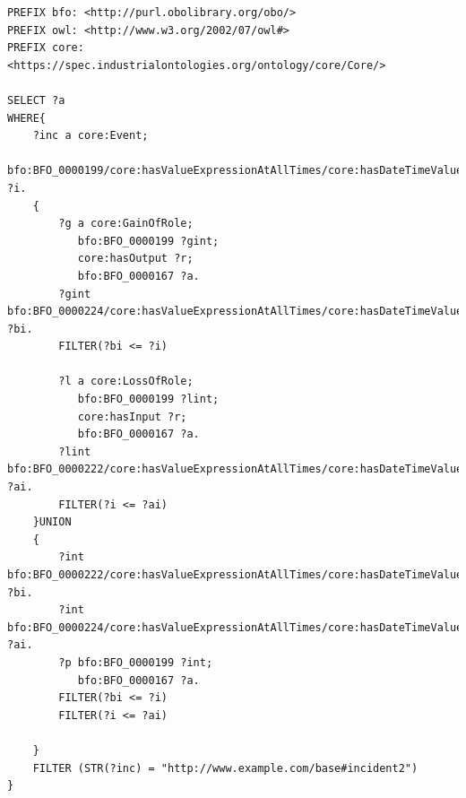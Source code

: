 \begin{verbatim}
PREFIX bfo: <http://purl.obolibrary.org/obo/>
PREFIX owl: <http://www.w3.org/2002/07/owl#>
PREFIX core: <https://spec.industrialontologies.org/ontology/core/Core/>

SELECT ?a
WHERE{
    ?inc a core:Event;
         bfo:BFO_0000199/core:hasValueExpressionAtAllTimes/core:hasDateTimeValue ?i.      
    {    
    	?g a core:GainOfRole;
           bfo:BFO_0000199 ?gint;
           core:hasOutput ?r;
           bfo:BFO_0000167 ?a.
        ?gint bfo:BFO_0000224/core:hasValueExpressionAtAllTimes/core:hasDateTimeValue ?bi.
        FILTER(?bi <= ?i)

        ?l a core:LossOfRole;
           bfo:BFO_0000199 ?lint;
           core:hasInput ?r;
           bfo:BFO_0000167 ?a.
        ?lint bfo:BFO_0000222/core:hasValueExpressionAtAllTimes/core:hasDateTimeValue ?ai.
        FILTER(?i <= ?ai)
    }UNION
    {
        ?int bfo:BFO_0000222/core:hasValueExpressionAtAllTimes/core:hasDateTimeValue ?bi.
        ?int bfo:BFO_0000224/core:hasValueExpressionAtAllTimes/core:hasDateTimeValue ?ai.
        ?p bfo:BFO_0000199 ?int;
           bfo:BFO_0000167 ?a.
        FILTER(?bi <= ?i)
        FILTER(?i <= ?ai)       
        
    }
    FILTER (STR(?inc) = "http://www.example.com/base#incident2")
}
\end{verbatim}
